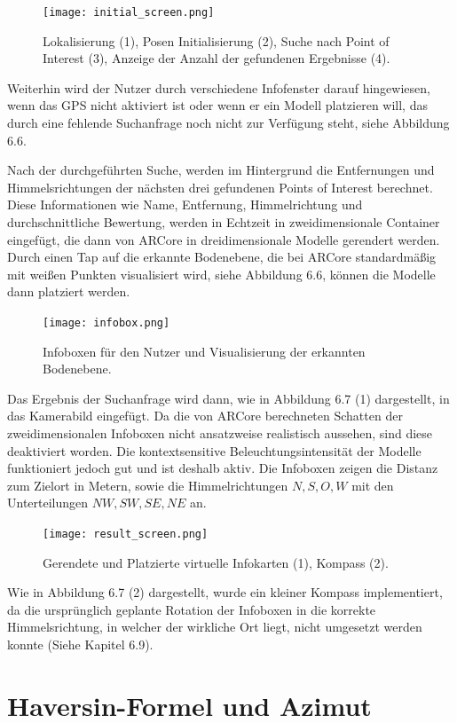 \begin{figure}[H]
	\centering
	\texttt{[image: initial\_screen.png]}
	\caption{Lokalisierung (1), Posen Initialisierung (2),  Suche nach Point of Interest (3), Anzeige der Anzahl der gefundenen Ergebnisse (4).}
\end{figure} 

Weiterhin wird der Nutzer durch verschiedene Infofenster darauf hingewiesen, wenn das GPS nicht aktiviert ist oder wenn er ein Modell platzieren will, das durch eine fehlende Suchanfrage noch nicht zur Verfügung steht, siehe Abbildung 6.6. 

Nach der durchgeführten Suche, werden im Hintergrund die Entfernungen und Himmelsrichtungen der nächsten drei gefundenen Points of Interest berechnet. Diese Informationen wie Name, Entfernung, Himmelrichtung und durchschnittliche Bewertung, werden in Echtzeit in zweidimensionale Container eingefügt, die dann von ARCore in dreidimensionale Modelle gerendert werden. Durch einen Tap auf die erkannte Bodenebene, die bei ARCore standardmäßig mit weißen Punkten visualisiert wird, siehe Abbildung 6.6, können die Modelle dann platziert werden.

\begin{figure}[H]
	\centering
	\texttt{[image: infobox.png]}
	\caption{Infoboxen für den Nutzer und Visualisierung der erkannten Bodenebene.}
\end{figure} 

Das Ergebnis der Suchanfrage wird dann, wie in Abbildung 6.7 (1) dargestellt, in das Kamerabild eingefügt. Da die von ARCore berechneten Schatten der zweidimensionalen Infoboxen nicht ansatzweise realistisch aussehen, sind diese deaktiviert worden. Die kontextsensitive Beleuchtungsintensität der Modelle funktioniert jedoch gut und ist deshalb aktiv. Die Infoboxen zeigen die Distanz zum Zielort in Metern, sowie die Himmelrichtungen $N, S, O, W$ mit den Unterteilungen $NW, SW, SE, NE$ an. 

\begin{figure}[H]
	\centering
	\texttt{[image: result\_screen.png]}
	\caption{Gerendete und Platzierte virtuelle Infokarten (1), Kompass (2).}
\end{figure} 

Wie in Abbildung 6.7 (2) dargestellt, wurde ein kleiner Kompass implementiert, da die ursprünglich geplante Rotation der Infoboxen in die korrekte Himmelsrichtung, in welcher der wirkliche Ort liegt, nicht umgesetzt werden konnte (Siehe Kapitel 6.9). 


\section{Haversin-Formel und Azimut}

